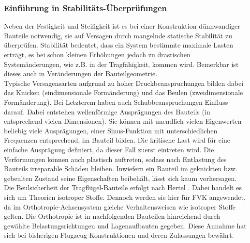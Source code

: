 \subsubsection{Einführung in Stabilitäts-Überprüfungen}
Neben der Festigkeit und Steifigkeit ist es bei einer Konstruktion dünnwandiger Bauteile notwendig, sie auf Versagen durch mangelnde statische Stabilität zu überprüfen. Stabilität bedeutet, dass ein System bestimmte maximale Lasten erträgt, es bei schon kleinen Erhöhungen jedoch zu drastischen Systemänderungen, wie z.B. in der Tragfähigkeit, kommen wird. Bemerkbar ist dieses auch in Veränderungen der Bauteilgeometrie.\\

\noindent Typische Versagensarten aufgrund zu hoher Druckbeanspruchungen bilden dabei das Knicken (eindimensionale Formänderung) und das Beulen (zweidimensionale Formänderung). Bei Letzterem haben auch Schubbeanspruchungen Einfluss darauf. Dabei entstehen wellenförmige Ausprägungen des Bauteils (in entsprechend vielen Dimensionen). Sie können mit unendlich vielen Eigenwerten beliebig viele Ausprägungen, einer Sinus-Funktion mit unterschiedlichen Frequenzen entsprechend, im Bauteil bilden. Die kritische Last wird für eine einfache Ausprägung definiert, da dieser Fall zuerst eintreten wird. Die Verformungen können auch plastisch auftreten, sodass nach Entlastung des Bauteils irreparable Schäden bleiben. Inwiefern ein Bauteil im geknickten bzw. gebeulten Zustand seine Eigenschaften beibehält, lässt sich kaum vorhersagen.\\

\noindent Die Beulsicherheit der Tragflügel-Bauteile erfolgt nach Hertel \cite{item1}. Dabei handelt es sich um Theorien isotroper Stoffe. Dennoch werden sie hier für FVK angewendet, da im Orthotropie-Achsensystem gleiche Verhaltensweisen wie isotroper Stoffe gelten. Die Orthotropie ist in nachfolgenden Bauteilen hinreichend durch gewählte Belastungsrichtungen und Lagenaufbauten gegeben. Diese Annahme hat sich bei bisherigen Flugzeug-Konstruktionen und deren Zulassungen bewährt.\\

